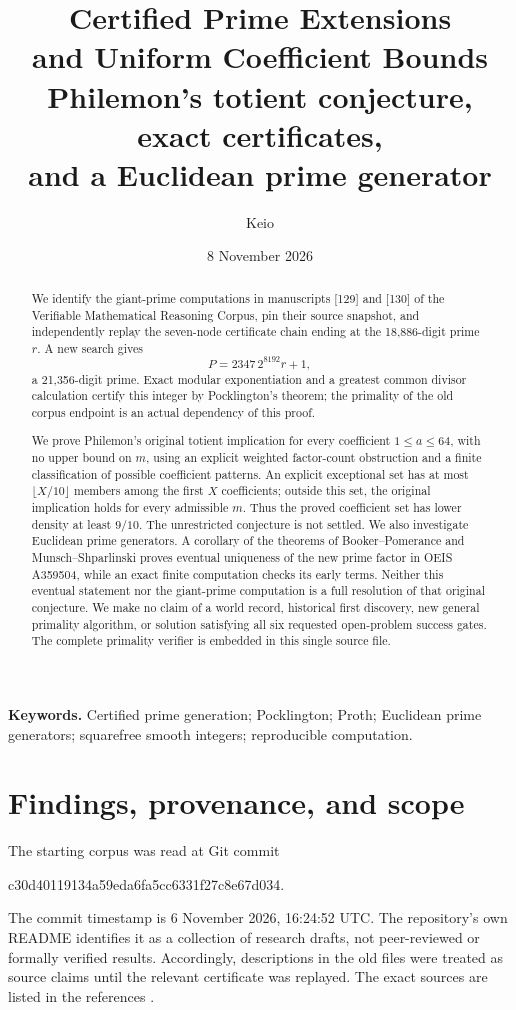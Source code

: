 \documentclass[11pt,a4paper]{article}
\title{\color{ink}\bfseries Certified Prime Extensions\\and Uniform Coefficient Bounds\\[6pt]
 \large\normalfont Philemon's totient conjecture, exact certificates,\\and a Euclidean prime generator}
\author{Keio}
\date{8 November 2026}
\theoremstyle{definition}\newtheorem{definition}[theorem]{Definition}
\theoremstyle{remark}\newtheorem{remark}[theorem]{Remark}
\begin{document}
\maketitle
\begin{abstract}
We identify the giant-prime computations in manuscripts [129] and [130] of
the Verifiable Mathematical Reasoning Corpus, pin their source snapshot,
and independently replay the seven-node certificate chain ending at the
18,886-digit prime $r$. A new search gives
\[
 P=2347\,2^{8192}r+1,
\]
a 21,356-digit prime. Exact modular exponentiation and a greatest common
divisor calculation certify this integer by Pocklington's theorem; the
primality of the old corpus endpoint is an actual dependency of this proof.

We prove Philemon's original totient implication for every coefficient
$1\leq a\leq64$, with no upper bound on $m$, using an explicit weighted
factor-count obstruction and a finite classification of possible coefficient
patterns. An explicit exceptional set has at most $\lfloor X/10\rfloor$
members among the first $X$ coefficients; outside this set, the original
implication holds for every admissible $m$. Thus the proved coefficient
set has lower density at least $9/10$. The unrestricted conjecture is not
settled. We also investigate
Euclidean prime generators. A corollary of the theorems of Booker--Pomerance
and Munsch--Shparlinski proves eventual uniqueness of the new prime factor
in OEIS A359504, while an exact finite computation checks its early terms.
Neither this eventual statement nor the giant-prime computation is a full
resolution of that original conjecture. We make no claim
of a world record, historical first discovery, new general primality algorithm, or
solution satisfying all six requested open-problem success gates.
The complete primality verifier is embedded in this single source file.
\end{abstract}
\vspace{3pt}
\noindent\textbf{Keywords.} Certified prime generation; Pocklington; Proth;
Euclidean prime generators; squarefree smooth integers; reproducible computation.
\newpage

\section{Findings, provenance, and scope}
The starting corpus was read at Git commit
\begin{center}\small\ttfamily c30d40119134a59eda6fa5cc6331f27c8e67d034.\end{center}
The commit timestamp is 6 November 2026, 16:24:52 UTC. The repository's own
README identifies it as a collection of research drafts, not peer-reviewed
or formally verified results. Accordingly, descriptions in the old files
were treated as source claims until the relevant certificate was replayed.
The exact sources are listed in the references \cite{corpus129,corpus130}.
\end{document}
